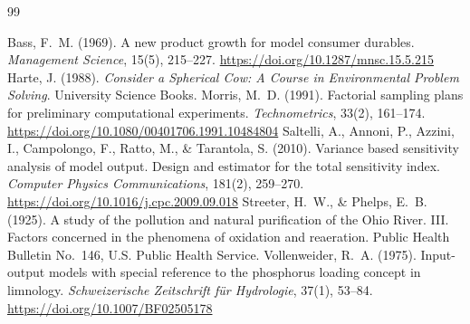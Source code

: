 \documentclass[11pt,oneside]{book}
\begin{document}
\begin{thebibliography}{99}\small
{}
 Bass, F.~M. (1969). A new product growth for model consumer durables. \emph{Management Science}, 15(5), 215--227. \url{https://doi.org/10.1287/mnsc.15.5.215}
 Harte, J. (1988). \emph{Consider a Spherical Cow: A Course in Environmental Problem Solving}. University Science Books.
 Morris, M.~D. (1991). Factorial sampling plans for preliminary computational experiments. \emph{Technometrics}, 33(2), 161--174. \url{https://doi.org/10.1080/00401706.1991.10484804}
 Saltelli, A., Annoni, P., Azzini, I., Campolongo, F., Ratto, M., \& Tarantola, S. (2010). Variance based sensitivity analysis of model output. Design and estimator for the total sensitivity index. \emph{Computer Physics Communications}, 181(2), 259--270. \url{https://doi.org/10.1016/j.cpc.2009.09.018}
 Streeter, H.~W., \& Phelps, E.~B. (1925). A study of the pollution and natural purification of the Ohio River. III. Factors concerned in the phenomena of oxidation and reaeration. Public Health Bulletin No.~146, U.S. Public Health Service.
 Vollenweider, R.~A. (1975). Input-output models with special reference to the phosphorus loading concept in limnology. \emph{Schweizerische Zeitschrift für Hydrologie}, 37(1), 53--84. \url{https://doi.org/10.1007/BF02505178}
\end{thebibliography}
\end{document}
